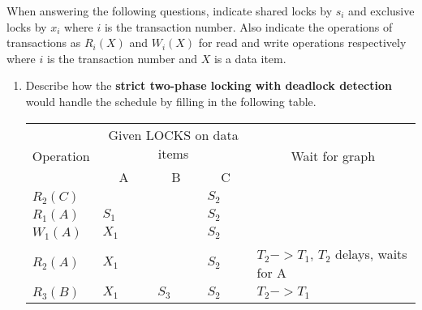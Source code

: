 \documentclass{article}
\begin{document}
\begin{enumerate}
    When answering the following questions, indicate shared locks by $ s_i $ and exclusive locks by $ x_i $ where $ i $ is the transaction number. Also indicate the operations of transactions as $ R_i(X) $ and $ W_i(X) $ for read and write operations respectively where $ i $ is the transaction number and $ X $ is a data item.
    
    \begin{enumerate}
    
        \item Describe how the \textbf{strict two-phase locking with deadlock detection} would handle the schedule by filling in the following table.
        
        \begin{center}
            \begin{longtable}{|p{2cm}|p{1.5cm}|p{1.5cm}|p{1.5cm}|p{6.5cm}|}
                \hline
                \multicolumn{1}{|c|}{\multirow{2}{*}{Operation}} & \multicolumn{3}{c}{Given LOCKS on data items} & \multicolumn{1}{|c|}{\multirow{2}{*}{Wait for graph}} \\
                \multicolumn{1}{|c|}{} & \multicolumn{1}{c}{A} & \multicolumn{1}{c}{B} & \multicolumn{1}{c}{C} & \multicolumn{1}{|c|}{} \\ 
                \hline
                \multirow{2}{*}{$R_2(C)$} & \multirow{2}{*}{} & \multirow{2}{*}{} & \multirow{2}{*}{$S_2$} & \multirow{2}{*}{} \\
                 &  & & & \\
                \hline 
                \multirow{2}{*}{$R_1(A)$} & \multirow{2}{*}{$S_1$} & \multirow{2}{*}{} & \multirow{2}{*}{$S_2$} & \multirow{2}{*}{} \\
                 & & & & \\
                \hline 
                \multirow{2}{*}{$W_1(A)$} & \multirow{2}{*}{$X_1$} & \multirow{2}{*}{} & \multirow{2}{*}{$S_2$} & \multirow{2}{*}{} \\
                 & & & & \\
                \hline
                \multirow{2}{*}{$R_2(A)$} & \multirow{2}{*}{$X_1$} & \multirow{2}{*}{} & \multirow{2}{*}{$S_2$} & \multirow{2}{*}{$T_2 -> T_1$, $T_2$ delays, waits for A} \\
                 & & & & \\
                \hline 
                \multirow{2}{*}{$R_3(B)$} & \multirow{2}{*}{$X_1$} & \multirow{2}{*}{$S_3$} & \multirow{2}{*}{$S_2$} & \multirow{2}{*}{$T_2 -> T_1$} \\

\end{longtable}
\end{center}
\end{enumerate}
\end{enumerate}
\end{document}
